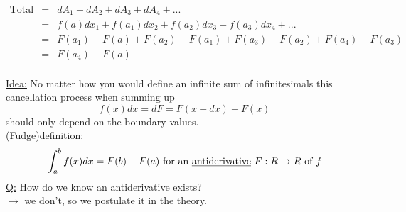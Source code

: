 \documentclass[a4paper, 12pt]{article}
\begin{document}
\begin{center}
\begin{eqnarray*}
\text{Total Area} &=&dA_1 + dA_2 + dA_3 + dA_4 + ... \\
& = & f(a)dx_1 + f(a_1)dx_2 + f(a_2)dx_3 + f(a_3)dx_4 + ...\\
& = & F(a_1) - F(a) + F(a_2) - F(a_1) + F(a_3) - F(a_2) + F(a_4) - F(a_3)\\
& = & F(a_4) - F(a)\\ 
\end{eqnarray*}
\end{center}
\underline{Idea:} No matter how you would define an infinite sum of infinitesimals this cancellation process when summing up $$f(x)dx = dF = F(x+dx) - F(x)$$ should only depend on the boundary values.\\
(Fudge)\underline{definition:} $$ \int_{a}^{b} f(x)dx = F(b) - F(a) \text{ for an \underline{antiderivative} } F:R \rightarrow R \text{ of } f$$
\underline{Q:} How do we know an antiderivative exists?\\
$\rightarrow$ we don't, so we postulate it in the theory.
\end{document}
